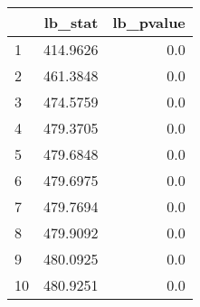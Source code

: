 \begin{tabular}{lrr}
\toprule
{} &   lb\_stat &  lb\_pvalue \\
\midrule
1  &  414.9626 &        0.0 \\
2  &  461.3848 &        0.0 \\
3  &  474.5759 &        0.0 \\
4  &  479.3705 &        0.0 \\
5  &  479.6848 &        0.0 \\
6  &  479.6975 &        0.0 \\
7  &  479.7694 &        0.0 \\
8  &  479.9092 &        0.0 \\
9  &  480.0925 &        0.0 \\
10 &  480.9251 &        0.0 \\
\bottomrule
\end{tabular}
